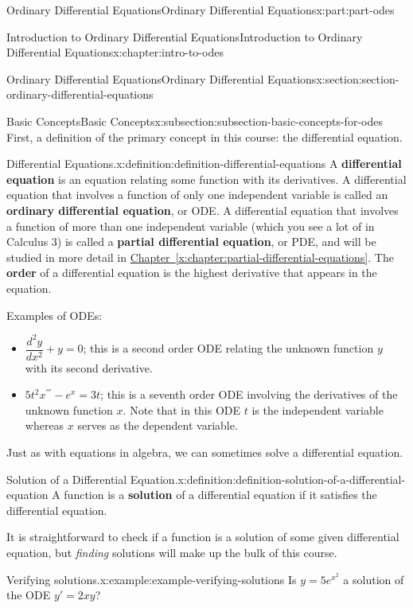 \documentclass[oneside,10pt,]{book}
\newcommand{\xreffont}{\relax}
\newcommand{\terminology}[1]{\textbf{#1}}
\numberwithin{equation}{part}
\newcommand{\dv}[3][]{\dfrac{d^{#1} #2}{d #3^{#1}}}
\begin{document}
\begin{partptx}{Ordinary Differential Equations}{}{Ordinary Differential Equations}{}{}{x:part:part-odes}
\begin{chapterptx}{Introduction to Ordinary Differential Equations}{}{Introduction to Ordinary Differential Equations}{}{}{x:chapter:intro-to-odes}
\begin{sectionptx}{Ordinary Differential Equations}{}{Ordinary Differential Equations}{}{}{x:section:section-ordinary-differential-equations}
\begin{subsectionptx}{Basic Concepts}{}{Basic Concepts}{}{}{x:subsection:subsection-basic-concepts-for-odes}
First, a definition of the primary concept in this course: the differential equation.%
\begin{definition}{Differential Equations.}{x:definition:definition-differential-equations}%
%
A \terminology{differential equation} is an equation relating some function with its derivatives. A differential equation that involves a function of only one independent variable is called an \terminology{ordinary differential equation}, or ODE. A differential equation that involves a function of more than one independent variable (which you see a lot of in Calculus 3) is called a \terminology{partial differential equation}, or PDE, and will be studied in more detail in \hyperref[x:chapter:partial-differential-equations]{Chapter~{\xreffont\ref{x:chapter:partial-differential-equations}}}. The \terminology{order} of a differential equation is the highest derivative that appears in the equation.%
\end{definition}
Examples of ODEs:%
\begin{itemize}[label=\textbullet]
\item{}\(\dv[2]{y}{x} + y = 0\); this is a second order ODE relating the unknown function \(y\) with its second derivative.%
\item{}\(5t^{2}x^{'''} - e^{x} = 3t\); this is a seventh order ODE involving the derivatives of the unknown function \(x\). Note that in this ODE \(t\) is the independent variable whereas \(x\) serves as the dependent variable.%
\end{itemize}
%
\par
Just as with equations in algebra, we can sometimes solve a differential equation.%
\begin{definition}{Solution of a Differential Equation.}{x:definition:definition-solution-of-a-differential-equation}%
%
A function is a \terminology{solution} of a differential equation if it satisfies the differential equation.%
\end{definition}
It is straightforward to check if a function is a solution of some given differential equation, but \emph{finding} solutions will make up the bulk of this course.%
\begin{example}{Verifying solutions.}{x:example:example-verifying-solutions}%
Is \(y = 5e^{x^{2}}\) a solution of the ODE \(y' = 2xy\)?%
\par\smallskip%

\end{example}
\end{subsectionptx}
\end{sectionptx}
\end{chapterptx}
\end{partptx}
\end{document}
